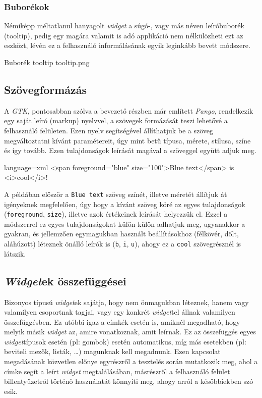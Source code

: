 \subsubsection{Buborékok}

Némiképp méltatlanul hanyagolt \textit{widget} a súgó-, vagy más néven leíróbuborék (tooltip), pedig egy magára valamit is adó applikáció nem nélkülözheti ezt az eszközt, lévén ez a felhasználó informálásának egyik leginkább bevett módszere.

{Buborék\cite{gtkmmtut}}
{tooltip}
{tooltip.png}

\subsection{Szövegformázás}

A \textit{GTK}, pontosabban szólva a bevezető részben már említett \textit{Pango}, rendelkezik egy saját leíró (markup) nyelvvel, a szövegek formázását teszi lehetővé a felhasználó felületen. Ezen nyelv segítségével állíthatjuk be a szöveg megváltoztatni kívánt paramétereit, úgy mint betű típusa, mérete, stílusa, színe és így tovább. Ezen tulajdonságok leírását magával a szöveggel együtt adjuk meg.

\lstoneline
{language=xml}
{<span foreground="blue" size="100">Blue text</span> is <i>cool</i>!}

A példában először a \texttt{Blue text} szöveg színét, illetve méretét állítjuk át igényeknek megfelelően, úgy hogy a kívánt szöveg köré az egyes tulajdonságok (\texttt{foreground}, \texttt{size}), illetve azok értékeinek leírását helyezzük el. Ezzel a módszerrel ez egyes tulajdonságokat külön-külön adhatjuk meg, ugyanakkor a gyakran, és jellemzően egymagukban használt beállításokhoz (félkövér, dőlt, aláhúzott) léteznek önálló leírók is (\texttt{b}, \texttt{i}, \texttt{u}), ahogy ez a \texttt{cool} szövegrésznél is látszik.

\subsection{\textit{Widget}ek összefüggései}

Bizonyos típusú \textit{widget}ek sajátja, hogy nem önmagukban léteznek, hanem vagy valamilyen csoportnak tagjai, vagy egy konkrét \textit{widget}tel állnak valamilyen összefüggésben. Ez utóbbi igaz a címkék esetén is, amiknél megadható, hogy melyik másik \textit{widget} az, amire vonatkoznak, amit leírnak. Ez az összefüggés egyes \textit{widget}típusok esetén (pl: gombok) esetén automatikus, míg más esetekben (pl: beviteli mezők, listák, \dots ) magunknak kell megadnunk. Ezen kapcsolat megadásának közvetlen előnye egyrészről a tesztelés során mutatkozik meg, ahol a címke segít a leírt \textit{widget} megtalálásában, másrészről a felhasználó felület billentyűzetről történő használatát könnyíti meg, ahogy arról a későbbiekben szó esik.


